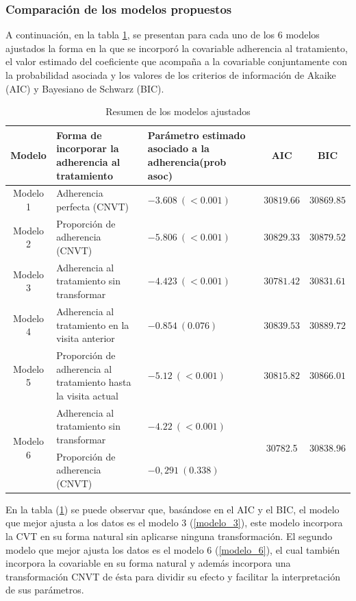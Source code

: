 \documentclass[spanish]{article}
\numberwithin{figure}{subsection}
\numberwithin{equation}{subsection}
\numberwithin{table}{subsection}
\begin{document}
\subsubsection{Comparación de los modelos propuestos}

A continuación, en la tabla \ref{comparacion}, se presentan para cada uno de los
6 modelos ajustados la forma en la que se incorporó la covariable adherencia al
tratamiento, el valor estimado del coeficiente que acompaña a la covariable
conjuntamente con la probabilidad asociada y los valores de los criterios de
información de Akaike (AIC) y Bayesiano de Schwarz (BIC).

\begin{table}[H]
	\centering
	\caption{Resumen de los modelos ajustados}
	\label{comparacion}
	\begin{tabular}{|c|p{5cm}|p{5cm}|c|c|}
		\hline
		Modelo & Forma de incorporar la adherencia al tratamiento & Parámetro estimado asociado a la adherencia(prob asoc) & AIC & BIC \\
		\hline
		Modelo 1 & Adherencia perfecta (CNVT) & $-3.608\ (<0.001)$ & $30819.66$ & $30869.85$ \\
		\hline
		Modelo 2 & Proporción de adherencia (CNVT) & $-5.806\ (<0.001)$ & $30829.33$ & $30879.52$ \\
		\hline
		Modelo 3 & Adherencia al tratamiento sin transformar & $-4.423\ (<0.001) $ & $30781.42$ & $30831.61$ \\
		\hline
		Modelo 4 & Adherencia al tratamiento en la visita anterior & $-0.854\ (0.076)$ & $30839.53$ & $30889.72$ \\
		\hline
		Modelo 5 & Proporción de adherencia al tratamiento hasta la visita actual & $-5.12\ (<0.001)$ & $30815.82$ & $30866.01$ \\
		\hline
		\multirow{2}{*}{Modelo 6}
		& Adherencia al tratamiento sin transformar & $-4.22\ (<0.001)$ & \multirow{2}{*}{30782.5} & \multirow{2}{*}{30838.96} \\
		\cline{2-3}
		& Proporción de adherencia (CNVT) & $-0,291\ (0.338)$ & & \\
		\hline
	\end{tabular}
\end{table}

En la tabla (\ref{comparacion}) se puede observar que, basándose en el AIC y el
BIC, el modelo que mejor ajusta a los datos es el modelo 3 (\ref{modelo_3}),
este modelo incorpora la CVT en su forma natural sin aplicarse ninguna
transformación. El segundo modelo que mejor ajusta los datos es el modelo 6
(\ref{modelo_6}), el cual también incorpora la covariable en su forma natural y
además incorpora una transformación CNVT de ésta para dividir su efecto y
facilitar la interpretación de sus parámetros.
\end{document}

